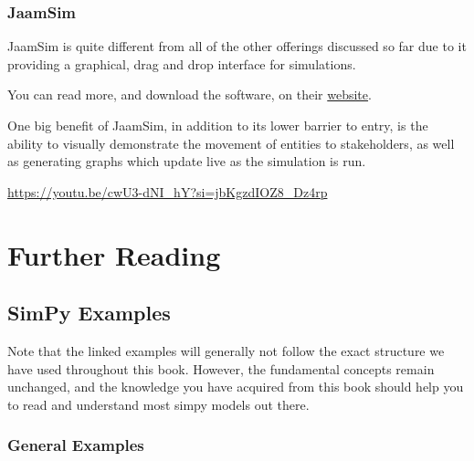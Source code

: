 \documentclass[
  letterpaper,
  DIV=11,
  numbers=noendperiod]{scrreprt}
\begin{document}
\subsection{JaamSim}\label{jaamsim}

JaamSim is quite different from all of the other offerings discussed so
far due to it providing a graphical, drag and drop interface for
simulations.

You can read more, and download the software, on their
\href{https://jaamsim.com/}{website}.

One big benefit of JaamSim, in addition to its lower barrier to entry,
is the ability to visually demonstrate the movement of entities to
stakeholders, as well as generating graphs which update live as the
simulation is run.

\url{https://youtu.be/cwU3-dNI_hY?si=jbKgzdIOZ8_Dz4rp}


\chapter{Further Reading}\label{further-reading}

\section{SimPy Examples}\label{simpy-examples}

\begin{tcolorbox}[enhanced jigsaw, rightrule=.15mm, colback=white, colframe=quarto-callout-warning-color-frame, colbacktitle=quarto-callout-warning-color!10!white, toprule=.15mm, coltitle=black, opacityback=0, titlerule=0mm, bottomtitle=1mm, breakable, title=\textcolor{quarto-callout-warning-color}{\faExclamationTriangle}\hspace{0.5em}{Warning}, opacitybacktitle=0.6, toptitle=1mm, arc=.35mm, bottomrule=.15mm, leftrule=.75mm, left=2mm]

Note that the linked examples will generally not follow the exact
structure we have used throughout this book. However, the fundamental
concepts remain unchanged, and the knowledge you have acquired from this
book should help you to read and understand most simpy models out there.

\end{tcolorbox}

\subsection{General Examples}\label{general-examples}
\end{document}
